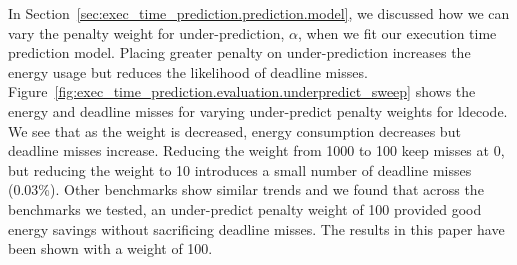 In Section~\ref{sec:exec_time_prediction.prediction.model}, we discussed how we
can vary the penalty weight for under-prediction, $\alpha$, when we fit our
execution time prediction model. Placing greater penalty on under-prediction
increases the energy usage but reduces the likelihood of deadline misses.
Figure~\ref{fig:exec_time_prediction.evaluation.underpredict_sweep} shows the
energy and deadline misses for varying under-predict penalty weights for
ldecode. We see that as the weight is decreased, energy consumption decreases
but deadline misses increase. Reducing the weight from 1000 to 100 keep misses
at 0, but reducing the weight to 10 introduces a small number of deadline
misses (0.03\%). Other benchmarks show similar trends and we found that across
the benchmarks we tested, an under-predict penalty weight of 100 provided good
energy savings without sacrificing deadline misses. The results in this paper
have been shown with a weight of 100.

